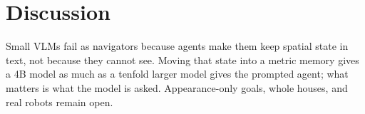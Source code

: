 \section{Discussion}
\label{sec:conclusion}

Small VLMs fail as navigators because agents make them keep spatial state in text, not because they cannot see.
Moving that state into a metric memory gives a 4B model as much as a tenfold larger model gives the prompted agent;
what matters is what the model is asked. Appearance-only goals, whole houses, and real robots remain open.
